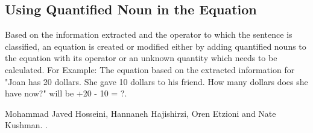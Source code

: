 \documentclass[11pt]{article}
\begin{document}
\subsection{Using Quantified Noun in the Equation}
Based on the information extracted and the operator to which the sentence is classified, an equation is created or modified either by adding quantified nouns to the equation with its operator or an unknown quantity which needs to be calculated. For Example: The equation based on the extracted information for "Joan has 20 dollars. She gave 10 dollars to his friend. How many dollars does she have now?" will be +20 - 10 = ?.

\begin{thebibliography}{}
  
  Mohammad Javed Hosseini, Hannaneh Hajishirzi, Oren Etzioni and Nate Kushman.
  .
  
\end{thebibliography}
\end{document}

